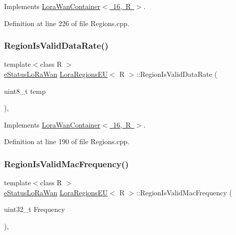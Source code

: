 Implements \mbox{\hyperlink{class_lora_wan_container_a2eea298e891240d3367f2405b852964a}{Lora\+Wan\+Container$<$ 16, R $>$}}.



Definition at line 226 of file Regions.\+cpp.

\mbox{\label{class_lora_regions_e_u_aeb59fccca463d845279c448a6fa46548}} 
\subsubsection{\texorpdfstring{Region\+Is\+Valid\+Data\+Rate()}{RegionIsValidDataRate()}}
{\footnotesize\ttfamily template$<$class R $>$ \\
\mbox{\hyperlink{_define_8h_a1cea710adbbf5b02bced8f79cd82f7b9}{e\+Status\+Lo\+Ra\+Wan}} \mbox{\hyperlink{class_lora_regions_e_u}{Lora\+Regions\+EU}}$<$ R $>$\+::Region\+Is\+Valid\+Data\+Rate (\begin{DoxyParamCaption}\item[{uint8\+\_\+t}]{temp }\end{DoxyParamCaption})\hspace{0.3cm}{\ttfamily [protected]}, {\ttfamily [virtual]}}



Implements \mbox{\hyperlink{class_lora_wan_container_aeec0ea6c3979df30b2d9b27bdb8ea043}{Lora\+Wan\+Container$<$ 16, R $>$}}.



Definition at line 190 of file Regions.\+cpp.

\mbox{\label{class_lora_regions_e_u_a192e8af5bcab83f1f7ff48b5d130206e}} 
\subsubsection{\texorpdfstring{Region\+Is\+Valid\+Mac\+Frequency()}{RegionIsValidMacFrequency()}}
{\footnotesize\ttfamily template$<$class R $>$ \\
\mbox{\hyperlink{_define_8h_a1cea710adbbf5b02bced8f79cd82f7b9}{e\+Status\+Lo\+Ra\+Wan}} \mbox{\hyperlink{class_lora_regions_e_u}{Lora\+Regions\+EU}}$<$ R $>$\+::Region\+Is\+Valid\+Mac\+Frequency (\begin{DoxyParamCaption}\item[{uint32\+\_\+t}]{Frequency }\end{DoxyParamCaption})\hspace{0.3cm}{\ttfamily [protected]}, {\ttfamily [virtual]}}



